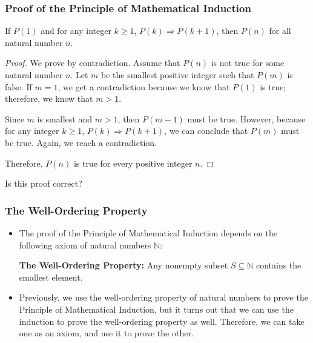 \begin{frame}\frametitle{Proof of the Principle of Mathematical Induction}
  \begin{theorem}
    If $P(1)$ and for any integer $k\geq 1$, $P(k)\Rightarrow P(k+1)$,
    then $P(n)$ for all natural number $n$.
  \end{theorem}
  \begin{proof}
    \pause We prove by contradiction.  \pause Assume that $P(n)$ is
    not true for some natural number $n$.  \pause Let $m$ be the
    smallest positive integer such that $P(m)$ is false.  \pause If
    $m=1$, we get a contradiction because we know that $P(1)$ is true;
    therefore, we know that $m>1$. \pause
 
    Since $m$ is smallest and $m > 1$, then $P(m-1)$ must be
    true. \pause However, because for any integer $k\geq 1$,
    $P(k)\Rightarrow P(k+1)$, we can conclude that $P(m)$ must be
    true.  Again, we reach a contradiction. \pause

    Therefore, $P(n)$ is true for every positive integer $n$.
  \end{proof}
  \pause

  Is this proof correct?
\end{frame}

\begin{frame}\frametitle{The Well-Ordering Property}
  \begin{itemize}
  \item The proof of the Principle of Mathematical Induction depends
    on the following axiom of natural numbers ${\mathbb N}$:
    \vspace{0.2in}

    \begin{tcolorbox}
      {\bf The Well-Ordering Property:} Any nonempty subset
      $S\subseteq{\mathbb N}$ contains the smallest element.
    \end{tcolorbox}
    \pause

    \vspace{0.1in}

  \item Previously, we use the well-ordering property of natural
    numbers to prove the Principle of Mathematical Induction, but it
    turns out that we can use the induction to prove the well-ordering
    property as well. \pause Therefore, we can take one as an axiom,
    and use it to prove the other.
  \end{itemize}
\end{frame}
